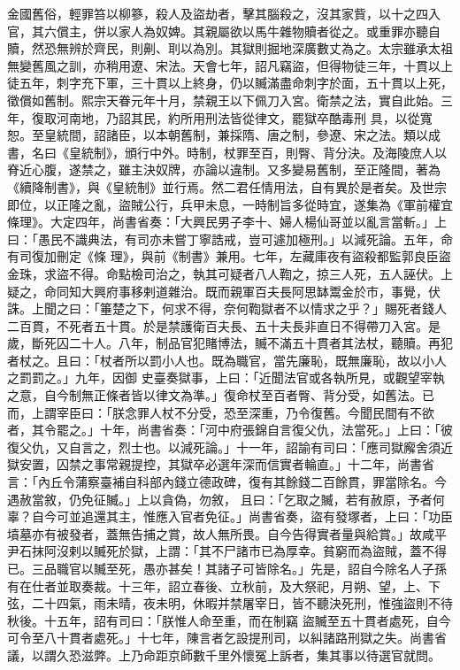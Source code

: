 \begin{pinyinscope}
 金國舊俗，輕罪笞以柳篸，殺人及盜劫者，擊其腦殺之，沒其家貲，以十之四入官，其六償主，併以家人為奴婢。其親屬欲以馬牛雜物贖者從之。或重罪亦聽自贖，然恐無辨於齊民，則劓、刵以為別。其獄則掘地深廣數丈為之。太宗雖承太祖無變舊風之訓，亦稍用遼、宋法。天會七年，詔凡竊盜，但得物徒三年，十貫以上徒五年，刺字充下軍，三十貫以上終身，仍以贓滿盡命刺字於面，五十貫以上死，徵償如舊制。熙宗天眷元年十月，禁親王以下佩刀入宮。衛禁之法，實自此始。三年，復取河南地，乃詔其民，約所用刑法皆從律文，罷獄卒酷毒刑
 具，以從寬恕。至皇統間，詔諸臣，以本朝舊制，兼採隋、唐之制，參遼、宋之法。類以成書，名曰《皇統制》，頒行中外。時制，杖罪至百，則臀、背分決。及海陵庶人以脊近心腹，遂禁之，雖主決奴牌，亦論以違制。又多變易舊制，至正隆間，著為《續降制書》，與《皇統制》並行焉。然二君任情用法，自有異於是者矣。及世宗即位，以正隆之亂，盜賊公行，兵甲未息，一時制旨多從時宜，遂集為《軍前權宜條理》。大定四年，尚書省奏：「大興民男子李十、婦人楊仙哥並以亂言當斬。」上曰：「愚民不識典法，有司亦未嘗丁寧誥戒，豈可遽加極刑。」以減死論。五年，命有司復加刪定《條
 理》，與前《制書》兼用。七年，左藏庫夜有盜殺都監郭良臣盜金珠，求盜不得。命點檢司治之，執其可疑者八人鞫之，掠三人死，五人誣伏。上疑之，命同知大興府事移剌道雜治。既而親軍百夫長阿思缽鬻金於市，事覺，伏誅。上聞之曰：「箠楚之下，何求不得，奈何鞫獄者不以情求之乎？」賜死者錢人二百貫，不死者五十貫。於是禁護衛百夫長、五十夫長非直日不得帶刀入宮。是歲，斷死囚二十人。八年，制品官犯賭博法，贓不滿五十貫者其法杖，聽贖。再犯者杖之。且曰：「杖者所以罰小人也。既為職官，當先廉恥，既無廉恥，故以小人之罰罰之。」九年，因御
 史臺奏獄事，上曰：「近聞法官或各執所見，或觀望宰執之意，自今制無正條者皆以律文為準。」復命杖至百者臀、背分受，如舊法。已而，上謂宰臣曰：「朕念罪人杖不分受，恐至深重，乃令復舊。今聞民間有不欲者，其令罷之。」十年，尚書省奏：「河中府張錦自言復父仇，法當死。」上曰：「彼復父仇，又自言之，烈士也。以減死論。」十一年，詔諭有司曰：「應司獄廨舍須近獄安置，囚禁之事常親提控，其獄卒必選年深而信實者輪直。」十二年，尚書省言：「內丘令蒲察臺補自科部內錢立德政碑，復有其餘錢二百餘貫，罪當除名。今遇赦當敘，仍免征贓。」上以貪偽，勿敘，
 且曰：「乞取之贓，若有赦原，予者何辜？自今可並追還其主，惟應入官者免征。」尚書省奏，盜有發塚者，上曰：「功臣墳墓亦有被發者，蓋無告捕之賞，故人無所畏。自今告得實者量與給賞。」故咸平尹石抹阿沒剌以贓死於獄，上謂：「其不尸諸市已為厚幸。貧窮而為盜賊，蓋不得已。三品職官以贓至死，愚亦甚矣！其諸子可皆除名。」先是，詔自今除名人子孫有在仕者並取奏裁。十三年，詔立春後、立秋前，及大祭祀，月朔、望，上、下弦，二十四氣，雨未晴，夜未明，休暇并禁屠宰日，皆不聽決死刑，惟強盜則不待秋後。十五年，詔有司曰：「朕惟人命至重，而在制竊
 盜贓至五十貫者處死，自今可令至八十貫者處死。」十七年，陳言者乞設提刑司，以糾諸路刑獄之失。尚書省議，以謂久恐滋弊。上乃命距京師數千里外懷冤上訴者，集其事以待選官就問。




\end{pinyinscope}
